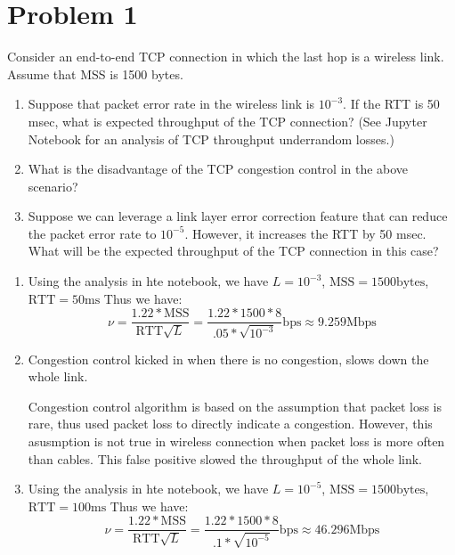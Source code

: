 \section*{Problem 1}

Consider an end-to-end TCP connection in which the last hop is a wireless link.
Assume that MSS is 1500 bytes.
\begin{enumerate}
      \item  Suppose that packet error rate in the wireless link is $10^{-3}$.
            If the RTT is 50 msec, what is expected throughput of the TCP connection?
            (See Jupyter Notebook for an analysis of TCP throughput underrandom losses.)
      \item  What is the disadvantage of the TCP congestion control in the above scenario?
      \item  Suppose we can leverage a link layer error correction feature that can reduce the packet error rate to $10^{-5}$.
            However, it increases the RTT by 50 msec.
            What will be the expected throughput of the TCP connection in this case?
\end{enumerate}

\begin{enumerate}
      \item Using the analysis in hte notebook, we have $L = 10^{-3}$, $\text{MSS} = 1500 \text{bytes}$, $\text{RTT} = 50 \text{ms}$
            Thus we have:
            $$ \nu = \frac{1.22 * \text{MSS}}{\text{RTT} \sqrt{L}} = \frac{1.22 * 1500 * 8}{.05 * \sqrt{10^{-3}}} \text{bps} \approx 9.259 \text{Mbps}$$

      \item Congestion control kicked in when there is no congestion, slows down the whole link.

            Congestion control algorithm is based on the assumption that packet loss is rare, thus used packet loss to directly indicate a congestion.
            However, this asusmption is not true in wireless connection when packet loss is more often than cables.
            This false positive slowed the throughput of the whole link.

      \item Using the analysis in hte notebook, we have $L = 10^{-5}$, $\text{MSS} = 1500 \text{bytes}$, $\text{RTT} = 100 \text{ms}$
            Thus we have:
            $$ \nu = \frac{1.22 * \text{MSS}}{\text{RTT} \sqrt{L}} = \frac{1.22 * 1500 * 8}{.1 * \sqrt{10^{-5}}} \text{bps} \approx 46.296 \text{Mbps}$$

\end{enumerate}